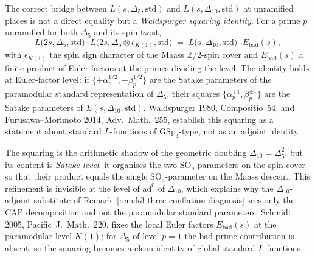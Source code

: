 
\begin{remark}
\label{rem:k3-waldspurger-squaring}
The correct bridge between $L(s,\Delta_5,\mathrm{std})$ and
$L(s,\Delta_{10},\mathrm{std})$ at unramified places is not a direct equality
but a \emph{Waldspurger squaring identity}. For a prime $p$ unramified for both
$\Delta_5$ and its spin twist,
\[
 L\bigl(2s,\Delta_5,\mathrm{std}\bigr)\cdot
 L\bigl(2s,\Delta_5 \otimes \epsilon_{K(1)},\mathrm{std}\bigr)
 \;=\;
 L\bigl(s,\Delta_{10},\mathrm{std}\bigr)\cdot E_{\mathrm{bad}}(s),
\]
with $\epsilon_{K(1)}$ the spin sign character of the Maass $\mathbb{Z}/2$-spin
cover and $E_{\mathrm{bad}}(s)$ a finite product of Euler factors at the primes
dividing the level. The identity holds at Euler-factor level: if
$\{\pm \alpha_p^{1/2}, \pm \beta_p^{1/2}\}$ are the Satake parameters of the
paramodular standard representation of $\Delta_5$, their squares
$\{\alpha_p^{\pm 1}, \beta_p^{\pm 1}\}$ are the Satake parameters of
$L(s,\Delta_{10},\mathrm{std})$. Waldspurger 1980, Compositio~54, and
Furusawa--Morimoto 2014, Adv.~Math.~255, establish this squaring as a statement
about standard $L$-functions of $\mathrm{GSp}_4$-type, not as an adjoint
identity.

The squaring is the arithmetic shadow of the geometric doubling $\Delta_{10} =
\Delta_5^2$, but its content is \emph{Satake-level}: it organises the two
$\mathrm{SO}_5$-parameters on the spin cover so that their product equals the
single $\mathrm{SO}_5$-parameter on the Maass descent. This refinement is
invisible at the level of $\mathrm{ad}^0$ of $\Delta_{10}$, which explains why
the $\Delta_{10}$-adjoint substitute of
Remark~\ref{rem:k3-three-conflation-diagnosis} sees only the CAP decomposition
and not the paramodular standard parameters. Schmidt 2005,
Pacific~J.~Math.~220, fixes the local Euler factors $E_{\mathrm{bad}}(s)$ at
the paramodular level $K(1)$; for $\Delta_5$ of level $p=1$ the bad-prime
contribution is absent, so the squaring becomes a clean identity of global
standard $L$-functions.
\end{remark}

